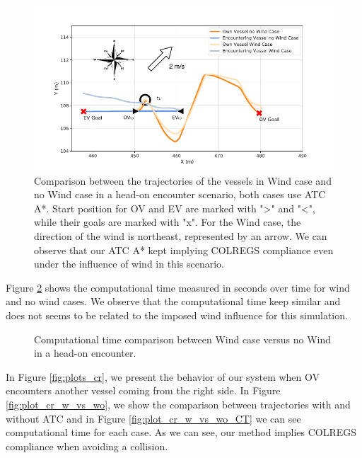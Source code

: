         
        \begin{figure}[H]
            \centering
            \includegraphics[width=\textwidth]{figs/Chap5/plot_ho_w_vs_wind.pdf}
            \caption{Comparison between the trajectories of the vessels in Wind case and no Wind case in a head-on encounter scenario, both cases use \ac{ATC} A*. Start position for \ac{OV} and \ac{EV} are marked with ">" and "<", while their goals are marked with "x". For the Wind case, the direction of the wind is northeast, represented by an arrow. We can observe that our \ac{ATC} A* kept implying COLREGS compliance even under the influence of wind in this scenario.}
            \label{fig:plot_ho_w_vs_wind}
        \end{figure}
        
        Figure \ref{fig:plot_ho_w_vs_wind_CT} shows the computational time measured in seconds over time for wind and no wind cases. We observe that the computational time keep similar and does not seems to be related to the imposed wind influence for this simulation.
        \begin{figure}[H]
            \centering
            
            \caption{Computational time comparison between Wind case versus no Wind in a head-on encounter.}
            \label{fig:plot_ho_w_vs_wind_CT}
        \end{figure}
        
        In Figure \ref{fig:plots_cr}, we present the behavior of our system when \ac{OV} encounters another vessel coming from the right side. In Figure \ref{fig:plot_cr_w_vs_wo}, we show the comparison between trajectories with and without ATC and in Figure \ref{fig:plot_cr_w_vs_wo_CT} we can see computational time for each case. As we can see, our method implies COLREGS compliance when avoiding a collision.
        
